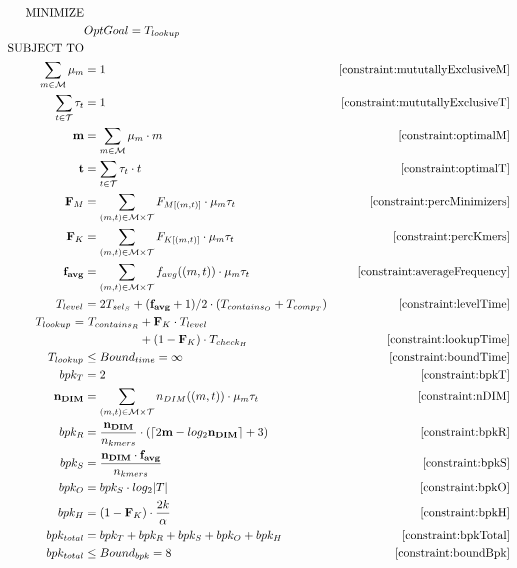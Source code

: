 \documentclass[a4paper,titlepage,onecolumn,oneside,12pt,nenglish,titlepage=firstiscover]{scrbook}
\theoremstyle{plain} %
\theoremstyle{definition} %
\theoremstyle{remark} %
\theoremstyle{plain}
\newcommand{\minimizerLength}{m}
\newcommand{\threshold}{t}
\newcommand{\timeForOperationOnStructure}[2]{T_{#1_{#2}}} %
\newcommand{\possibleMinimizerLengths}{\mathcal{M}}
\newcommand{\possibleThresholds}{\mathcal{T}}
\newcommand{\indicatorm}{\mu}
\newcommand{\indicatort}{\tau}
\newcommand{\varMinimizerLength}{\textbf{\minimizerLength}}
\newcommand{\varThreshold}{\textbf{\threshold}}
\begin{document}
\begin{align*}
	\text{MINIMIZE}\\
		&OptGoal = \timeForOperationOnStructure{lookup}{}\\
	\text{SUBJECT TO}\\
	\mututallyExclusiveM &\cref{constraint:mututallyExclusiveM} \\
	\mututallyExclusiveT &\cref{constraint:mututallyExclusiveT} \\
	\optimalM &\cref{constraint:optimalM}\\
	\optimalT &\cref{constraint:optimalT}\\
	\cdfMExpression &\cref{constraint:percMinimizers}\\
	\cdfKExpression &\cref{constraint:percKmers}\\
	\varAverageFrequencyExpression &\cref{constraint:averageFrequency}\\
	\levelTime &\cref{constraint:levelTime}\\
	\lookupTimeExpression &\cref{constraint:lookupTime}\\
	\timeForOperationOnStructure{lookup}{} &\leq Bound_{time} = \infty &\cref{constraint:boundTime}\\
	\bpkT &\cref{constraint:bpkT}\\
	\nDIMExpression &\cref{constraint:nDIM}\\
	\bpkR &\cref{constraint:bpkR}\\
	\bpkS &\cref{constraint:bpkS}\\
	\bpkO &\cref{constraint:bpkO}\\
	\bpkH &\cref{constraint:bpkH}\\
	\bpkTotal &\cref{constraint:bpkTotal}\\
	bpk_{total} &\leq Bound_{bpk} = 8 &\cref{constraint:boundBpk}\\
\end{align*}
\end{document}
